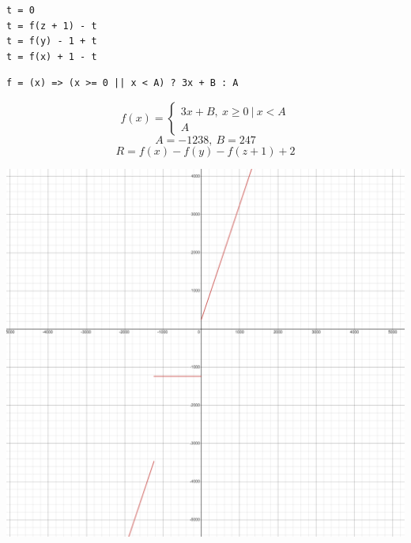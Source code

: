 \documentclass{article}
\begin{document}





















\begin{lstlisting}
t = 0
t = f(z + 1) - t
t = f(y) - 1 + t
t = f(x) + 1 - t
\end{lstlisting}
\begin{lstlisting}
f = (x) => (x >= 0 || x < A) ? 3x + B : A
\end{lstlisting}

$$
  f(x) = \begin{cases}
    3x + B,\  x \ge 0\ |\ x < A \\
    A
  \end{cases}
$$
$$   A = -1238,\ B = 247$$
$$    R = f(x) - f(y) - f(z + 1) + 2 $$
\begin{center}
  \includegraphics[scale=0.4]{graph.png}
\end{center}
\end{document}
